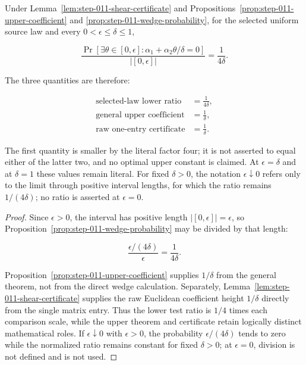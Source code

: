 \begin{proposition}
\label{prop:step-011-scale-comparison}

Under Lemma~\ref{lem:step-011-shear-certificate} and
Propositions~\ref{prop:step-011-upper-coefficient} and
\ref{prop:step-011-wedge-probability}, for the selected uniform source law and every
\(0<\epsilon\leq\delta\leq1\),

\begin{equation}
\label{eq:appendix-display-366}
\frac{
\Pr[\exists\theta\in[0,\epsilon]:
\alpha_1+\alpha_2\theta/\delta=0]
}{\lvert[0,\epsilon]\rvert}
=\frac1{4\delta}.
\end{equation}

The three quantities are therefore:

\begin{equation}
\label{eq:appendix-display-367}
\begin{aligned}
\text{selected-law lower ratio}&=\frac1{4\delta},\\
\text{general upper coefficient}&=\frac1\delta,\\
\text{raw one-entry certificate}&=\frac1\delta.
\end{aligned}
\end{equation}

The first quantity is smaller by the literal factor four; it is not asserted to equal either of the latter two,
and no optimal upper constant is claimed.
At \(\epsilon=\delta\) and at \(\delta=1\) these values remain literal. For fixed \(\delta>0\), the notation
\(\epsilon\downarrow0\) refers only to the limit through positive interval lengths, for which the ratio remains
\(1/(4\delta)\); no ratio is asserted at \(\epsilon=0\).


\end{proposition}

\begin{proof}
Since \(\epsilon>0\), the interval has positive length
\(\lvert[0,\epsilon]\rvert=\epsilon\), so Proposition~\ref{prop:step-011-wedge-probability} may be divided by
that length:

\begin{equation}
\label{eq:appendix-display-368}
\frac{\epsilon/(4\delta)}{\epsilon}=\frac1{4\delta}.
\end{equation}

Proposition~\ref{prop:step-011-upper-coefficient} supplies \(1/\delta\) from the general theorem, not
from the direct wedge calculation. Separately, Lemma~\ref{lem:step-011-shear-certificate} supplies the raw
Euclidean coefficient height \(1/\delta\) directly from the single matrix entry. Thus the lower test ratio is
\(1/4\) times each comparison scale, while the upper theorem and certificate retain logically distinct
mathematical roles. If \(\epsilon\downarrow0\) with \(\epsilon>0\), the probability
\(\epsilon/(4\delta)\) tends to zero while the normalized ratio remains constant for fixed \(\delta>0\); at
\(\epsilon=0\), division is not defined and is not used. 
\end{proof}


